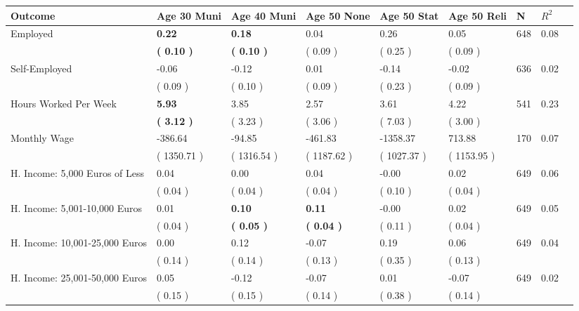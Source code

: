 \begin{tabular}{L{6.2cm} C{1.8cm} C{1.8cm} C{1.8cm} C{1.8cm} C{1.8cm} C{1.8cm} C{0.3cm} C{0.3cm}}
\toprule
 \textbf{Outcome} & \textbf{Age 30 Muni} & \textbf{Age 40 Muni} & \textbf{Age 50 None} & \textbf{Age 50 Stat} & \textbf{Age 50 Reli} & \textbf{N} & \textbf{$ R^2$} \\
\midrule
Employed & \textbf{     0.22} & \textbf{     0.18} &      0.04 &      0.26 &      0.05  & 648 &       0.08 \\ 
 & \textbf{(     0.10 )} & \textbf{(     0.10 )} & (     0.09 ) & (     0.25 ) & (     0.09 )  & \\
Self-Employed &     -0.06 &     -0.12 &      0.01 &     -0.14 &     -0.02  & 636 &       0.02 \\ 
 & (     0.09 ) & (     0.10 ) & (     0.09 ) & (     0.23 ) & (     0.09 )  & \\
Hours Worked Per Week & \textbf{     5.93} &      3.85 &      2.57 &      3.61 &      4.22  & 541 &       0.23 \\ 
 & \textbf{(     3.12 )} & (     3.23 ) & (     3.06 ) & (     7.03 ) & (     3.00 )  & \\
Monthly Wage &   -386.64 &    -94.85 &   -461.83 &  -1358.37 &    713.88  & 170 &       0.07 \\ 
 & (  1350.71 ) & (  1316.54 ) & (  1187.62 ) & (  1027.37 ) & (  1153.95 )  & \\
H. Income: 5,000 Euros of Less &      0.04 &      0.00 &      0.04 &     -0.00 &      0.02  & 649 &       0.06 \\ 
 & (     0.04 ) & (     0.04 ) & (     0.04 ) & (     0.10 ) & (     0.04 )  & \\
H. Income: 5,001-10,000 Euros &      0.01 & \textbf{     0.10} & \textbf{     0.11} &     -0.00 &      0.02  & 649 &       0.05 \\ 
 & (     0.04 ) & \textbf{(     0.05 )} & \textbf{(     0.04 )} & (     0.11 ) & (     0.04 )  & \\
H. Income: 10,001-25,000 Euros &      0.00 &      0.12 &     -0.07 &      0.19 &      0.06  & 649 &       0.04 \\ 
 & (     0.14 ) & (     0.14 ) & (     0.13 ) & (     0.35 ) & (     0.13 )  & \\
H. Income: 25,001-50,000 Euros &      0.05 &     -0.12 &     -0.07 &      0.01 &     -0.07  & 649 &       0.02 \\ 
 & (     0.15 ) & (     0.15 ) & (     0.14 ) & (     0.38 ) & (     0.14 )  & \\

\end{tabular}
